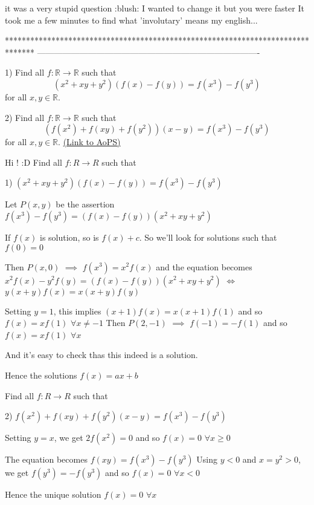 \begin{solution}
	it was a very stupid question  :blush: I wanted to change it but you were faster   
It took me a few minutes to find what 'involutary' means
my english...
\end{solution}
*******************************************************************************
-------------------------------------------------------------------------------

\begin{problem}
	1) Find all $f: \mathbb R \to \mathbb R$ such that
\[(x^2 + xy + y^2)(f(x) - f(y)) = f(x^3) - f(y^3)\]
for all $x,y \in \mathbb R$.

2) Find all $f: \mathbb R \to \mathbb R$ such that
\[ (f(x^2) + f(xy) + f(y^2))(x - y) = f(x^3) - f(y^3)\]
for all $x,y \in \mathbb R$.
	\flushright \href{https://artofproblemsolving.com/community/c6h313756}{(Link to AoPS)}
\end{problem}



\begin{solution}
	\begin{tcolorbox}Hi ! :D  
Find all $ f: R\rightarrow R$ such that

1) $ (x^2 + xy + y^2)(f(x) - f(y)) = f(x^3) - f(y^3)$\end{tcolorbox}

Let $ P(x,y)$ be the assertion $ f(x^3) - f(y^3) = (f(x) - f(y))(x^2 + xy + y^2)$

If $ f(x)$ is solution, so is $ f(x) + c$. So we'll look for solutions such that $ f(0) = 0$

Then $ P(x,0)$  $ \implies$ $ f(x^3) = x^2f(x)$ and the equation becomes $ x^2f(x) - y^2f(y) = (f(x) - f(y))(x^2 + xy + y^2)$ $ \iff$ $ y(x + y)f(x) = x(x + y)f(y)$ 

Setting $ y = 1$, this implies $ (x + 1)f(x) = x(x + 1)f(1)$ and so $ f(x) = xf(1)$ $ \forall x\ne - 1$
Then $ P(2, - 1)$ $ \implies$ $ f( - 1) = - f(1)$ and so $ f(x) = xf(1)$ $ \forall x$

And it's easy to check thas this indeed is a solution.

Hence the solutions $ \boxed{f(x) = ax + b}$

\begin{tcolorbox}Find all $ f: R\rightarrow R$ such that

2) $ f(x^2) + f(xy) + f(y^2)(x - y) = f(x^3) - f(y^3)$\end{tcolorbox}

Setting $ y=x$, we get $ 2f(x^2)  = 0$ and so $ f(x)=0$ $ \forall x\ge 0$

The equation becomes  $ f(xy) = f(x^3) - f(y^3)$
Using $ y<0$ and $ x=y^2>0$, we get $ f(y^3) = - f(y^3)$ and so $ f(x)=0$ $ \forall x< 0$

Hence the unique solution $ \boxed{f(x)=0}$ $ \forall x$
\end{solution}



